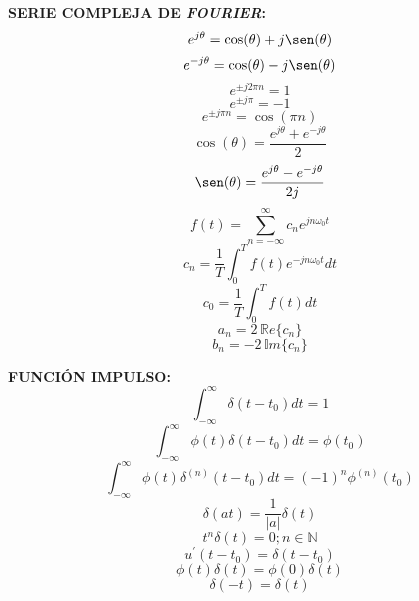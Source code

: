 \documentclass[letter,twoside,8pt]{article}
\begin{document}
\textbf{SERIE COMPLEJA DE \emph{FOURIER}:}
\begin{equation*}
    e^{j\theta}=\cos(\theta)+j\sen(\theta)
\end{equation*}
\begin{equation*}
    e^{-j\theta}=\cos(\theta)-j\sen(\theta)
\end{equation*}
\begin{equation*}
    e^{{\pm}j2{\pi}n}=1
\end{equation*}
\begin{equation*}
    e^{{\pm}j\pi}=-1
\end{equation*}
\begin{equation*}
    e^{{\pm}j{\pi}n}=\cos({\pi}n)
\end{equation*}
\begin{equation*}
    \cos(\theta)=\frac{e^{j\theta}+e^{-j\theta}}{2}
\end{equation*}
\begin{equation*}
    \sen(\theta)=\frac{e^{j\theta}-e^{-j\theta}}{2j}
\end{equation*}
\begin{equation*}
f(t)=\sum_{n=-\infty}^{\infty}{c_n}e^{jn{\omega_0}t}
\end{equation*}
\begin{equation*}
    c_n=\frac{1}{T}\int_0^{T}f(t)e^{-jn{\omega_0}t}{dt}
\end{equation*}
\begin{equation*}
    c_0=\frac{1}{T}\int_0^{T}f(t){dt}
\end{equation*}
\begin{equation*}
    a_n=2\,\mathbb{R}e\{c_n\}
\end{equation*}
\begin{equation*}
    b_n=-2\,\mathbb{I}m\{c_n\}
\end{equation*}

\textbf{FUNCIÓN IMPULSO:}
\begin{equation*}
    \int_{-\infty}^{\infty}\delta(t-t_0){dt}=1
\end{equation*}
\begin{equation*}
    \int_{-\infty}^{\infty}\phi(t)\delta(t-t_0){dt}=\phi(t_0)
\end{equation*}
\begin{equation*}
    \int_{-\infty}^{\infty}\phi(t)\delta^{(n)}(t-t_0){dt}={(-1)}^n\phi^{(n)}(t_0)
\end{equation*}
\begin{equation*}
    \delta(at)=\frac{1}{|a|}\delta(t)
\end{equation*}
\begin{equation*}
    t^{n}\delta(t)=0;{n}\in\mathbb{N}
\end{equation*}
\begin{equation*}
    u^{\prime}(t-t_0)=\delta(t-t_0)
\end{equation*}
\begin{equation*}
    \phi(t)\delta(t)=\phi(0)\delta(t)
\end{equation*}
\begin{equation*}
    \delta(-t)=\delta(t)
\end{equation*}
\end{document}
